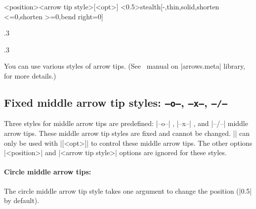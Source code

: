 \begin{tzdef}{}
\settzmidarrow<position>{<arrow tip style>}[<opt>]
  <0.5>{stealth}[-,thin,solid,shorten <=0,shorten >=0,bend right=0]
\end{tzdef}


\begin{tzcode}{.3}
{}
\end{tzcode}


\begin{tzcode}{.3}
\end{tzcode}

You can use various styles of arrow tips. (See \Tikz\ manual on |arrows.meta| library, for more details.)



\subsection{Fixed middle arrow tip styles: \texttt{--o--}, \texttt{--x--}, \texttt{--/--}}

Three styles for middle arrow tips are predefined:  |--o--| ,  |--x--| , and  |--/--| middle arrow tips.
These middle arrow tip styles are fixed and cannot be changed.
|\settzmidarrow| can only be used with |[<opt>]| to control these middle arrow tips.
The other options |<position>| and |{<arrow tip style>}| options are ignored for these styles.

\paragraph{Circle middle arrow tips:}

The circle middle arrow tip style  takes one argument to change the position (|0.5| by default).

